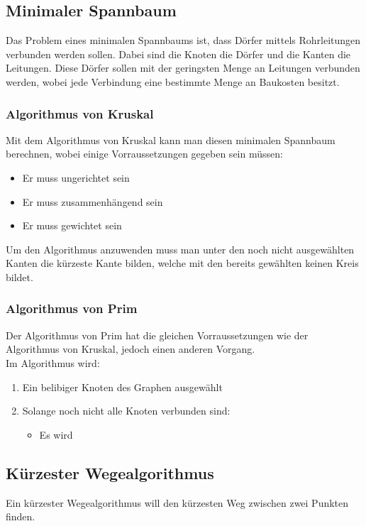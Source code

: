 \documentclass{article}
\begin{document}
	\subsection{Minimaler Spannbaum}
	Das Problem eines minimalen Spannbaums ist, dass Dörfer mittels Rohrleitungen verbunden werden sollen. Dabei sind die Knoten die Dörfer und die Kanten die Leitungen. Diese Dörfer sollen mit der geringsten Menge an Leitungen verbunden werden, wobei jede Verbindung eine bestimmte Menge an Baukosten besitzt.
	\subsubsection{Algorithmus von Kruskal}
	Mit dem Algorithmus von Kruskal kann man diesen minimalen Spannbaum berechnen, wobei einige Vorraussetzungen gegeben sein müssen:
	\begin{itemize}
		\item{Er muss ungerichtet sein}
		\item{Er muss zusammenhängend sein}
		\item{Er muss gewichtet sein}
	\end{itemize}
	Um den Algorithmus anzuwenden muss man unter den noch nicht ausgewählten Kanten die kürzeste Kante bilden, welche mit den bereits gewählten keinen Kreis bildet.
	\subsubsection{Algorithmus von Prim}
	Der Algorithmus von Prim hat die gleichen Vorraussetzungen wie der Algorithmus von Kruskal, jedoch einen anderen Vorgang. \\
	Im Algorithmus wird:
	\begin{enumerate}
		\item{Ein belibiger Knoten des Graphen ausgewählt}
		\item{Solange noch nicht alle Knoten verbunden sind:}
		\begin{itemize}
			\item{Es wird}
		\end{itemize}
	\end{enumerate}
	\subsection{Kürzester Wegealgorithmus}
	Ein kürzester Wegealgorithmus will den kürzesten Weg zwischen zwei Punkten finden.
\end{document}
